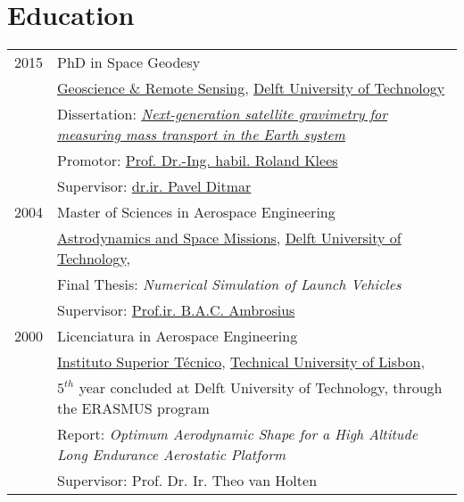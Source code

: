 \documentclass[a4paper]{article}
\newenvironment{cvsection}[2]{
  \vspace{0.2in}
  \section*{#1}
  \vspace{-0.2in}
  \def\arraystretch{1.33}
  \begin{longtable}{lp{#2}}
}{
  \end{longtable}
}
\begin{document}
\begin{cvsection}{Education}{13.5cm}

2015 & PhD in Space Geodesy\\
     & \href{http://www.citg.tudelft.nl/over-faculteit/afdelingen/geoscience-and-remote-sensing/}{Geoscience \& Remote Sensing},
       \href{http://www.tudelft.nl/}{Delft University of Technology}\\
     &  Dissertation: \href{http://dx.doi.org/10.4233/uuid:d0c61fd2-804b-4827-ae8a-e0e93d282a56}{\it Next-generation satellite gravimetry for measuring mass transport in the Earth system}\\
     & Promotor:
\href{http://www.citg.tudelft.nl/en/about-faculty/departments/geoscience-and-remote-sensing/staff/scientific-staff/profdr-inghabil-roland-klees/}{Prof. Dr.-Ing. habil. Roland Klees}\\
     & Supervisor: \href{http://www.citg.tudelft.nl/en/about-faculty/departments/geoscience-and-remote-sensing/staff/scientific-staff/dr-pg-pavel-ditmar/}{dr.ir. Pavel Ditmar}\\
\hline
2004 & Master of Sciences in Aerospace Engineering \\
     & \href{http://www.as.lr.tudelft.nl}{Astrodynamics and Space Missions},
       \href{http://www.tudelft.nl/}{Delft University of Technology},\\
     & Final Thesis: {\it Numerical Simulation of Launch Vehicles}\\
     & Supervisor: \href{http://www.lr.tudelft.nl/en/organisation/departments/space-engineering/astrodynamics-and-space-missions/people/profir-bac-ambrosius/}{Prof.ir. B.A.C. Ambrosius}\\
\hline
2000 & Licenciatura in Aerospace Engineering \\
     & \href{http://www.ist.utl.pt/}{Instituto Superior T{\'e}cnico},
       \href{http://www.utl.pt/}{Technical University of Lisbon},\\
     & $5^{th}$ year concluded at Delft University of Technology, through the ERASMUS program\\
     & Report: {\it Optimum Aerodynamic Shape for a High Altitude Long Endurance Aerostatic Platform}\\
     & Supervisor: Prof. Dr. Ir. Theo van Holten\\

\end{cvsection}

\end{document}
